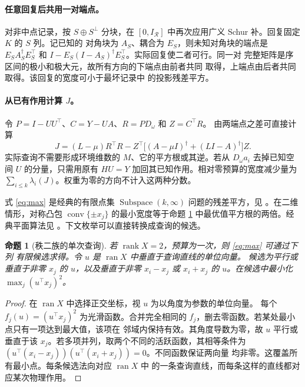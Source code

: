 \documentclass[UTF8,11pt,fontset=windows]{ctexart}
\newtheorem{proposition}[theorem]{命题}
\newcommand{\ran}{\operatorname{ran}}
\newcommand{\rank}{\operatorname{rank}}
\begin{document}
\paragraph{任意回复后共用一对端点。}
对非中点记录，按 \(S\oplus S^\perp\) 分块，在 \([0,I_{\mathcal R}]\)
中再次应用广义 Schur 补。回复固定 \(K\) 的 \(S\) 列。记已知的
对角块为 \(A_S\)、耦合为 \(E_S\)，则未知对角块的端点是
\(E_S A_S^\dagger E_S^\top\) 和
\(I-E_S(I-A_S)^\dagger E_S^\top\)。实际回复使二者可行。同一对
完整矩阵是序区间的极小和极大元，故所有方向的下端点由前者共同
取得，上端点由后者共同取得。该回复的宽度可小于最坏记录中
的投影残差平方。

\paragraph{从已有作用计算 \(J\)。}
令 \(P=I-UU^\top\)、\(C=Y-UA\)、\(R=PD_\omega\) 和 \(Z=C^\top R\)。
由两端点之差可直接计算
\[
 J=(L-\mu)R^\top R-
    Z^\top\big[(A-\mu I)^\dagger+(LI-A)^\dagger\big]Z .
\]
实际查询不需要形成环境维数的 \(M\)、它的平方根或其逆。若从
\(D_\omega a_i\) 去掉已知空间 \(U\) 的分量，只需用原有 \(HU=Y\)
加回其已知作用。相对零预算的宽度减少量为
\(\sum_{i\le k}\lambda_i(J)\)。权重为零的方向不计入这两种分数。

式 \eqref{eq:max} 是经典的有限点集 \(\operatorname{Subspace}(k,\infty)\) 问题的残差平方，见 \cite{DTV}。在二维情形，对称凸包 \(\operatorname{conv}\{\pm x_j\}\) 的最小宽度等于命题 \ref{prop:plane} 中最优值平方根的两倍。经典平面算法见 \cite{HouleToussaint}。下文枚举可以直接转换成查询的候选。

\begin{proposition}[秩二族的单次查询]\label{prop:plane}
若 \(\rank X=2\)，预算为一次，则 \eqref{eq:max} 可通过下列
有限候选求得。令 \(u\) 是 \(\ran X\) 中垂直于查询直线的单位向量。
候选为平行或垂直于非零 \(x_j\) 的 \(u\)，以及垂直于非零
\(x_i-x_j\) 或 \(x_i+x_j\) 的 \(u\)。在候选中最小化
\(\max_j(u^\top x_j)^2\)。
\end{proposition}

\begin{proof}
在 \(\ran X\) 中选择正交坐标，视 \(u\) 为以角度为参数的单位向量。
每个 \(f_j(u)=(u^\top x_j)^2\) 为光滑函数。合并完全相同的
\(f_j\)，删去零函数。若某处最小点只有一项达到最大值，该项在
邻域内保持有效。其角度导数为零，故 \(u\) 平行或垂直于该
\(x_j\)。若多项并列，取两个不同的活跃函数，其相等条件为
\((u^\top(x_i-x_j))(u^\top(x_i+x_j))=0\)。不同函数保证两向量
均非零。这覆盖所有最小点。每条候选法向对应 \(\ran X\) 中
的一条查询直线，而每条这样的直线都对应某次物理作用。
\end{proof}
\end{document}
